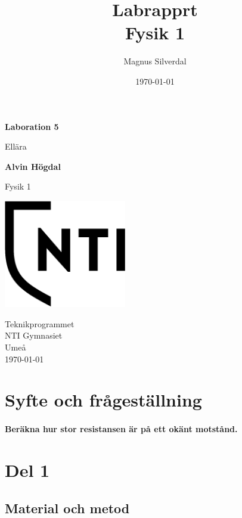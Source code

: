 \documentclass[11p]{article}
\title{Labrapprt \\ \small Fysik 1}
\author{Magnus Silverdal }
\date{\today}
\begin{document}
    \begin{titlepage}
        \begin{center}
            \vspace*{1cm}

            \Huge
            \textbf{Laboration 5}

            \vspace{0.5cm}
            \LARGE
            Ellära

            \vspace{1.5cm}

            \textbf{Alvin Högdal}

            \vfill


            Fysik 1

            \vspace{0.8cm}

            \includegraphics[width=0.4\textwidth]{../images/NTI Gymnasiet_Symbol_print_svart.png}

            \Large
            Teknikprogrammet\\
            NTI Gymnasiet\\
            Umeå\\
            \today

        \end{center}
    \end{titlepage}
    \section{Syfte och frågeställning}
    \paragraph{Beräkna hur stor resistansen är på ett okänt motstånd.}
    
    \section{Del 1}
    \subsection{Material och metod}
\end{document}
